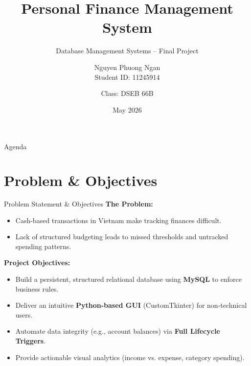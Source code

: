 \documentclass[aspectratio=169]{beamer}
\title[Personal Finance Management System]{Personal Finance Management System}
\subtitle{Database Management Systems -- Final Project}
\author[Nguyen Phuong Ngan]{Nguyen Phuong Ngan\\ \footnotesize Student ID: 11245914 \and Class: DSEB 66B}
\institute[DSEB 66B]{
    National Economics University \\
    \medskip
    \text{Instructor: PhD. Tran Hung}
}
\date{May 2026}
\begin{document}
\begin{frame}
    \titlepage
\end{frame}

\begin{frame}{Agenda}
    \tableofcontents
\end{frame}

\section{Problem \& Objectives}
\begin{frame}{Problem Statement \& Objectives}
    \textbf{The Problem:}
    \begin{itemize}
        \item Cash-based transactions in Vietnam make tracking finances difficult.
        \item Lack of structured budgeting leads to missed thresholds and untracked spending patterns.
    \end{itemize}
    
    \vspace{0.3cm}
    \textbf{Project Objectives:}
    \begin{itemize}
        \item Build a persistent, structured relational database using \textbf{MySQL} to enforce business rules.
        \item Deliver an intuitive \textbf{Python-based GUI} (CustomTkinter) for non-technical users.
        \item Automate data integrity (e.g., account balances) via \textbf{Full Lifecycle Triggers}.
        \item Provide actionable visual analytics (income vs. expense, category spending).
    \end{itemize}
\end{frame}

\end{document}
